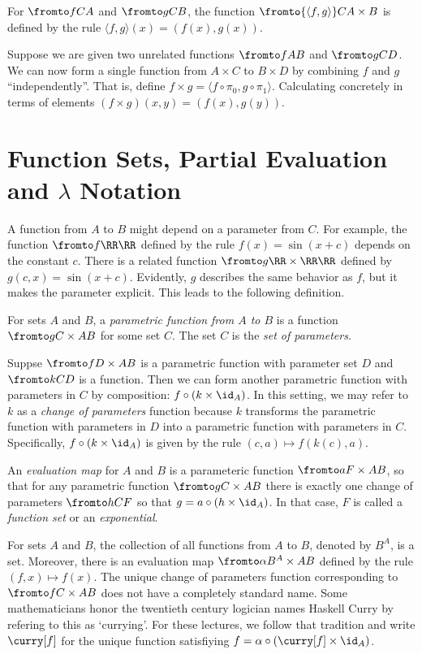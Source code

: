 For $\fromto fCA$ and $\fromto gCB$, the function $\fromto {\langle f,g\rangle}C{A\times B}$ is defined by 
the rule $\langle f,g\rangle(x)=(f(x),g(x))$.

Suppose we are given two unrelated functions $\fromto fAB$ and $\fromto gCD$. We can now form a single function
from $A\times C$ to $B\times D$ by combining $f$ and $g$ ``independently''. That is, define $f\times g = \langle f\circ \pi_0,g\circ \pi_1\rangle$. Calculating concretely in terms of elements $(f\times g)(x,y) = (f(x),g(y))$. 

\section{Function Sets, Partial Evaluation and $\lambda$ Notation}

A function from $A$ to $B$ might depend on a parameter from $C$. 
For example, the function $\fromto f\RR\RR$ defined by the rule $f(x) = \sin(x + c)$ depends on the constant $c$.
There is a related function $\fromto g{\RR\times \RR}\RR$ defined by $g(c,x) = \sin(x+c)$. Evidently, $g$
describes the same behavior as $f$, but it makes the parameter explicit. This leads to the following definition.

\begin{defn}
	For sets $A$ and $B$, a \emph{parametric function from $A$ to $B$} is a function $\fromto g{C\times A}B$ for some set $C$.
	The set $C$ is the \emph{set of parameters}.
	
	Suppse $\fromto f{D\times A}B$ is a parametric function with parameter set $D$ and $\fromto kCD$ is a function.
	Then we can form another parametric function with parameters in $C$ by composition: $f\circ (k\times \id_A)$.
	In this setting, we may refer to $k$ as a \emph{change of parameters} function because $k$ transforms
	the parametric function with parameters in $D$ into a parametric function with parameters in $C$. Specifically, $f\circ(k\times \id_A)$ is given by the rule $(c,a)\mapsto f(k(c),a)$. 
	
	An \emph{evaluation map} for $A$ and $B$ is a parameteric function $\fromto a{F\times A}B$, so that for any 
	parametric function $\fromto g{C\times A}B$ there is exactly one change of parameters $\fromto hCF$ so that
	$g = a\circ (h\times \id_A)$. In that case, $F$ is called a \emph{function set} or an \emph{exponential}.
\end{defn}

\begin{axiom}
	For sets $A$ and $B$, the collection of all functions from $A$ to $B$, denoted by $B^A$, is a set. Moreover,
	there is an evaluation map $\fromto \alpha{B^A\times A}B$ defined by the rule $(f,x) \mapsto f(x)$.
	The unique change of parameters function corresponding to $\fromto f{C\times A}B$ does not have a completely standard name. Some mathematicians honor the twentieth century logician names Haskell Curry by refering to this as `currying'. For these lectures, we follow that tradition and write $\curry[f]$ 
	for the unique function satisfiying $f = \alpha\circ (\curry[f] \times \id_A)$.
\end{axiom}

